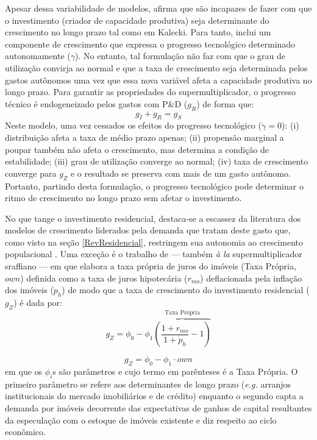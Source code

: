 Apesar dessa variabilidade de modelos, \textcite{dutt_observations_2018} afirma que são incapazes de fazer com que o investimento (criador de capacidade produtiva) seja determinante do crescimento no longo prazo tal como em Kalecki. Para tanto, inclui um componente de crescimento que expressa o progresso tecnológico determinado autonomamente ($\gamma$). No entanto, tal formulação não faz com que o grau de utilização convirja ao normal e que a taxa de crescimento seja determinada pelos gastos autônomos uma vez que essa nova variável afeta a capacidade produtiva no longo prazo. Para garantir as propriedades do supermultiplicador, o progresso técnico é endogeneizado pelos gastos com P\&D ($g_R$) de forma que:
$$
g_I + g_R = g_S
$$
Neste modelo, uma vez cessados os efeitos do progresso tecnológico ($\dot \gamma = 0$): 
	(i) distribuição afeta a taxa de médio prazo apenas; 
	(ii) propensão marginal a poupar também não afeta o crescimento, mas determina a condição de estabilidade; 
	(iii) grau de utilização converge ao normal; 
	(iv) taxa de crescimento converge para $g_Z$ e o resultado se preserva com mais de um gasto autônomo. Portanto, partindo desta formulação, o progresso tecnológico pode determinar o ritmo de crescimento no longo prazo sem afetar o investimento.

No que tange o investimento residencial, destaca-se a escassez da literatura dos modelos de crescimento liderados pela demanda que tratam deste gasto que, como visto na seção \ref{RevResidencial}, restringem sua autonomia ao crescimento populacional \cite{gowans_introducing_2014}. Uma exceção é o trabalho de \textcite{teixeira_crescimento_2015} ---  também \textit{à la} supermultiplicador sraffiano --- em que elabora a taxa própria de juros do imóveis (Taxa Própria, $own$) definida como a taxa de juros hipotecária ($r_{mo}$) deflacionada pela inflação dos imóveis ({$\dot p_h$}) de modo que a taxa de crescimento do investimento residencial ($g_Z$) é dada por:
$$
g_Z = \phi_0 - \phi_1 \overbrace{\left(\frac{1+r_{mo}}{1+\dot p_h} - 1\right)}^{\text{Taxa Própria}}
$$

\begin{equation}
g_Z = \phi_0 - \phi_1\cdot own
\end{equation}
em que os $\phi_i$s são parâmetros e cujo termo em parênteses é a Taxa Própria. 
O primeiro parâmetro se refere aos determinantes de longo prazo (\textit{e.g.} arranjos institucionais do mercado imobiliários e de crédito) enquanto o segundo capta a demanda por imóveis decorrente das expectativas de ganhos de capital resultantes da especulação com o estoque de imóveis existente e diz respeito ao ciclo econômico.

